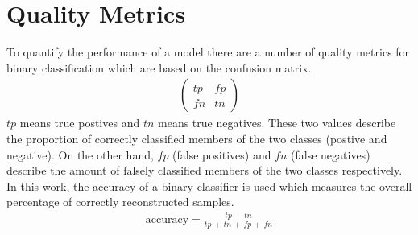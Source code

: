 \section{Quality Metrics}
\label{sec:quality_metrics}
To quantify the performance of a model there are a number of quality metrics for binary classification which are based on the confusion matrix.
\begin{align}
    \begin{pmatrix}
        tp & fp \\
        fn & tn
    \end{pmatrix}
\end{align}
$tp$ means true postives and $tn$ means true negatives. 
These two values describe the proportion of correctly classified members of the two classes (postive and negative).
On the other hand, $fp$ (false positives) and $fn$ (false negatives) describe the amount of falsely classified members of the two classes respectively.
In this work, the accuracy of a binary classifier is used which measures the overall percentage of correctly reconstructed samples.
\begin{align}
    \text{accuracy} = \frac{tp\, +\, tn}{tp\, +\, tn\, +\, fp\, +\, fn}
\end{align}
